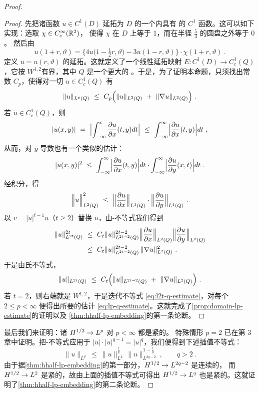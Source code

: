 \begin{proof}
\begin{proof}
先把诸函数 $u\in C^{1}(D)$ 延拓为 $D$ 的一个\trNeighborhood{}内具有%
\trCompactSupport{}的 $C^{1}$ 函数。这可以如下实现：选取 $\chi\in C^{\infty}_{c}(\mathbb{R}^{2})$，%
使得 $\chi$ 在 $D$ 上等于 $1$，而在半径 $\tfrac{5}{4}$ 的圆盘之外等于 $0$。%
然后由
\[
u(1+r,\vartheta)=\bigl\{4u\bigl(1-\tfrac{1}{2}r,\vartheta\bigr)-3u(1-r,\vartheta)\bigr\}%
\cdot\chi(1+r,\vartheta)\ .
\]
定义 $u=u(r,\vartheta)$ 的延拓。这就定义了一个线性延拓映射%
 $E:C^{1}(D)\to C^{1}_{c}(Q)$，它按 $W^{1,2}$\trNorm{}有界，其中 $Q$ 是一个更大的%
\trDomain。于是，为了证明本命题，只须找出常数 $C_{p}$，使得对一切%
 $u\in C^{1}_{c}(Q)$ 有
\begin{equation}\label{eq:lp-q-estimate}
\|u\|_{L^{p}(Q)}\ \leq\ C_{p}\Bigl(\|u\|_{L^{2}(Q)}\ +\ \|\nabla u\|_{L^{2}(Q)}\Bigr)\ .
\end{equation}
若 $u\in C^{1}_{c}(Q)$，则
\[
|u(x,y)|\ =\ \Bigl|\int_{-\infty}^{x}\frac{\partial u}{\partial x}(t,y)dt\Bigr|\ \leq\ %
\int_{-\infty}^{\infty}\Bigl|\frac{\partial u}{\partial x}(t,y)\Bigr|dt\ ,
\]
从而，对 $y$ 导数也有一个类似的估计：
\[
|u(x,y)|^{2}\ \leq\ \int_{-\infty}^{\infty}\Bigl|\frac{\partial u}{\partial x}(t,y)\Bigr|dt%
\cdot\int_{-\infty}^{\infty}\Bigl|\frac{\partial u}{\partial y}(x,t)\Bigr|dt\ .
\]
经积分，得
\[
\Bigl\|u\Bigr\|^{2}_{L^{2}(Q)}\ \leq\ \Bigl\|\frac{\partial u}{\partial x}\Bigr\|_{L^{1}(Q)}%
\cdot\Bigl\|\frac{\partial u}{\partial y}\Bigr\|_{L^{1}(Q)}\ .
\]
以 $v=|u|^{t-1}u$（$t\geq2$）替换 $u$，由\trCauchy-\trSchwarz{}不等式我们得到
\[
\begin{aligned}
\|u\|^{2t}_{L^{2t}(Q)}\ &\leq\ C_{t}\|u\|^{2t-2}_{L^{2t-2}(Q)}%
\Bigl\|\frac{\partial u}{\partial x}\Bigr\|_{L^{2}(Q)}\Bigl\|\frac{\partial u}{\partial y}\Bigr\|_{L^{2}(Q)}\\
&\leq\ C_{t}\|u\|^{2t-2}_{L^{2t-2}(Q)}\,\|\nabla u\|^{2}_{L^{2}(Q)}\ .
\end{aligned}
\]
于是由\trYoung{}氏不等式，
\begin{equation}\label{eq:l2t-q-estimate}
\|u\|_{L^{2t}(Q)}\ \leq\ C_{t}\Bigl(\|u\|_{L^{2t-2}(Q)}\ +\ \|\nabla u\|_{L^{2}(Q)}\Bigr)\ .
\end{equation}
若 $t=2$，则右端就是 $W^{1,2}$\trNorm，于是迭代不等式%
 \eqref{eq:l2t-q-estimate}，对每个 $2\leq p<\infty$ 便得出所要的估计%
 \eqref{eq:lp-q-estimate}。这就完成了\cref{prop:domain-lp-estimate}的证明以及%
\cref{thm:hhalf-lp-embedding}的第一条论断。
\end{proof}

最后我们来证明：诸\trEmbedding{} $H^{1/2}\to L^{p}$ 对 $p<\infty$ 都是紧的。%
特殊情形 $p=2$ 已在第 3 章中证明。把\trCauchy-\trSchwarz{}不等式应用于%
 $|u|\cdot|u|^{q-1}=|u|^{q}$，我们便得到下述插值不等式：
\[
\|u\|_{L^{q}}\ \leq\ \|u\|^{\frac{1}{q}}_{L^{2}}\,\|u\|^{1-\frac{1}{q}}_{L^{2q-2}}\ ,\qquad q>2\ .
\]
由于据\cref{thm:hhalf-lp-embedding}的第一部分，$H^{1/2}\to L^{2q-2}$ 是连续的，%
而 $H^{1/2}\to L^{2}$ 是紧的，故由上面的插值不等式可得出 $H^{1/2}\to L^{q}$ %
也是紧的。这就证明了\cref{thm:hhalf-lp-embedding}的第二条论断。
\end{proof}

